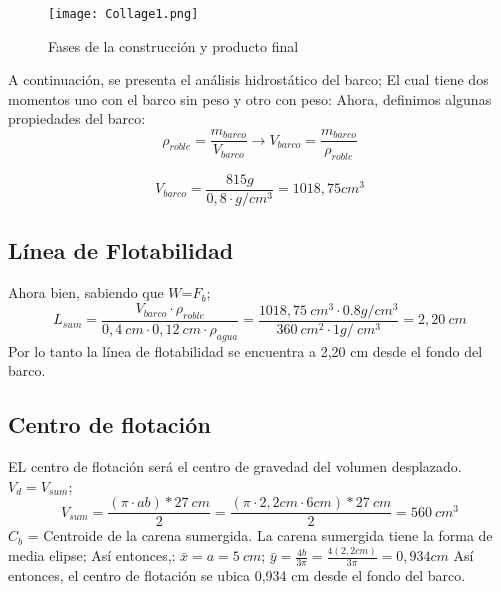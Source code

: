 \documentclass[letterpaper]{article}
\begin{document}
\begin{figure}[H]
	\centering
	\texttt{[image: Collage1.png]}
	\caption{Fases de la construcción y producto final}
	\label{fig:imagen2}
\end{figure}
\newpage
A continuación, se presenta el análisis hidrostático del barco; El cual tiene dos momentos uno con el barco sin peso y otro con peso:
\newline
Ahora, definimos algunas propiedades del barco:
\begin{equation}
	\rho_{roble}=\frac{m_{barco}}{V_{barco}} \rightarrow {V_{barco}}=\frac{ m_{barco}} {\rho_{roble}}
\end{equation}

\begin{equation}
	 {V_{barco}}=\frac{ 815g} {0,8 \cdot g/cm^3} = 1018,75 cm^3
\end{equation}
\subsection{Línea de Flotabilidad}
Ahora bien, sabiendo que $W$=$F_b$; 
\begin{equation}
	L_{sum}=\frac{{V_{barco}} \cdot \rho_{roble}}{0,4~cm \cdot 0,12~cm \cdot \rho_{agua}}=\frac{{1018,75~cm^3} \cdot 0.8g/cm^3}{360~cm^2 \cdot 1g/~cm^3}=2,20~cm
\end{equation}
Por lo tanto la línea de flotabilidad se encuentra a 2,20 cm desde el fondo del barco.
\subsection{Centro de flotación}
EL centro de flotación será el centro de gravedad del volumen desplazado.
\newline
\hspace{0.5cm}$V_{d}=V_{sum}$;
\begin{equation}
	V_{sum}= \frac{(\pi \cdot ab)*27~cm}{2} = \frac{(\pi \cdot 2,2cm \cdot 6cm)*27~cm}{2} = 560~cm^3
\end{equation}
$C_{b}$ = Centroide de la carena sumergida.
La carena sumergida tiene la forma de media elipse; Así entonces,:
$\bar{x}=a = 5~cm$;
\newline 
$\bar{y}= \frac{4b}{3\pi} = \frac{4(2,2cm)}{3\pi} = 0,934cm$
\newline
Así entonces, el centro de flotación se ubica 0,934 cm desde el fondo del barco.
\newpage 
\end{document}
